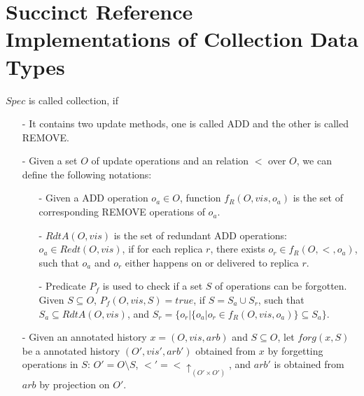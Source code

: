 
\section{Succinct Reference Implementations of Collection Data Types}
\label{sec:succinct reference implementations of collection data types}

$Spec$ is called collection, if

\begin{itemize}
\setlength{\itemsep}{0.5pt}
\item[-] It contains two update methods, one is called ADD and the other is called REMOVE.

\item[-] Given a set $O$ of update operations and an relation $<$ over $O$, we can define the following notations:

    \begin{itemize}
    \setlength{\itemsep}{0.5pt}
    \item[-] Given a ADD operation $o_a \in O$, function $f_R(O,\mathit{vis},o_a)$ is the set of corresponding REMOVE operations of $o_a$.

    \item[-] $RdtA(O,\mathit{vis})$ is the set of redundant ADD operations: $o_a \in Redt(O,\mathit{vis})$, if for each replica $r$, there exists $o_r \in f_R(O,<,o_a)$, such that $o_a$ and $o_r$ either happens on or delivered to replica $r$.

    \item[-] Predicate $P_f$ is used to check if a set $S$ of operations can be forgotten. Given $S \subseteq O$, $P_f(O,\mathit{vis},S) = \mathit{true}$, if $S = S_a \cup S_r$, such that $S_a \subseteq RdtA(O,\mathit{vis})$, and $S_r = \{ o_r \vert  \{ o_a \vert o_r \in f_R(O,\mathit{vis},o_a) \} \subseteq S_a \}$.
    \end{itemize}


\item[-] Given an annotated history $x = (O,\mathit{vis},\mathit{arb})$ and $S \subseteq O$, let $forg(x,S)$ be a annotated history $(O',\mathit{vis}',\mathit{arb}')$ obtained from $x$ by forgetting operations in $S$: $O' = O \setminus S$, $<' = < \uparrow_{(O' \times O')}$, and $\mathit{arb}'$ is obtained from $\mathit{arb}$ by projection on $O'$.


\end{itemize}
